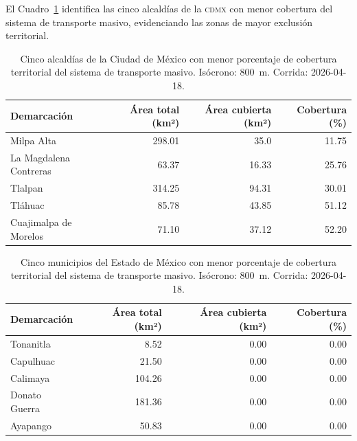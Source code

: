 El Cuadro~\ref{tab:peores-cdmx} identifica las cinco alcaldías de la
\textsc{cdmx} con menor cobertura del sistema de transporte masivo,
evidenciando las zonas de mayor exclusión territorial.

\begin{table}[H]
    \centering
    \caption[Alcaldías con menor cobertura de transporte masivo (CDMX)]{
    Cinco alcaldías de la Ciudad de México con menor porcentaje de cobertura
    territorial del sistema de transporte masivo. Isócrono: 800~m.
    Corrida: 2026-04-18.}
    \label{tab:peores-cdmx}
    \begin{tabular}{|l|r|r|r|}
        \hline
        \textbf{Demarcación} & \textbf{Área total (km²)} &
        \textbf{Área cubierta (km²)} & \textbf{Cobertura (\%)} \\
        \hline
        Milpa Alta              & 298.01 &  35.0    &  11.75 \\
        La Magdalena Contreras  &  63.37 &  16.33   &  25.76 \\
        Tlalpan                 & 314.25 &  94.31   &  30.01 \\
        Tláhuac                 &  85.78 &  43.85   &  51.12 \\
        Cuajimalpa de Morelos   &  71.10 &  37.12   &  52.20 \\
        \hline
    \end{tabular}
\end{table}

\begin{table}[H]
    \centering
    \caption[Municipios del EDOMEX con menor cobertura de transporte masivo]{
    Cinco municipios del Estado de México con menor porcentaje de cobertura
    territorial del sistema de transporte masivo. Isócrono: 800~m.
    Corrida: 2026-04-18.}
    \label{tab:peores-edomex}
    \begin{tabular}{|l|r|r|r|}
        \hline
        \textbf{Demarcación} & \textbf{Área total (km²)} &
        \textbf{Área cubierta (km²)} & \textbf{Cobertura (\%)} \\
        \hline
        Tonanitla       &   8.52 & 0.00 & 0.00 \\
        Capulhuac       &  21.50 & 0.00 & 0.00 \\
        Calimaya        & 104.26 & 0.00 & 0.00 \\
        Donato Guerra   & 181.36 & 0.00 & 0.00 \\
        Ayapango        &  50.83 & 0.00 & 0.00 \\
        \hline
    \end{tabular}
\end{table}

